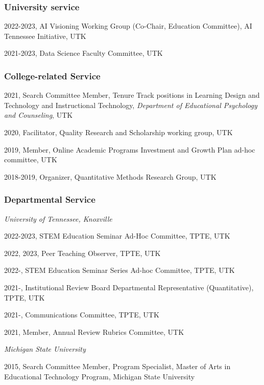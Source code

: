 \documentclass[
  14,
]{article}
\begin{document}
\hypertarget{university-service}{%
\subsubsection{University service}\label{university-service}}

2022-2023, AI Visioning Working Group (Co-Chair, Education Committee),
AI Tennessee Initiative, UTK

2021-2023, Data Science Faculty Committee, UTK

\hypertarget{college-related-service}{%
\subsubsection{College-related Service}\label{college-related-service}}

2021, Search Committee Member, Tenure Track positions in Learning Design
and Technology and Instructional Technology, \emph{Department of
Educational Psychology and Counseling}, UTK

2020, Facilitator, Quality Research and Scholarship working group, UTK

2019, Member, Online Academic Programs Investment and Growth Plan ad-hoc
committee, UTK

2018-2019, Organizer, Quantitative Methods Research Group, UTK

\hypertarget{departmental-service}{%
\subsubsection{Departmental Service}\label{departmental-service}}

\emph{University of Tennessee, Knoxville}

2022-2023, STEM Education Seminar Ad-Hoc Committee, TPTE, UTK

2022, 2023, Peer Teaching Observer, TPTE, UTK

2022-, STEM Education Seminar Series Ad-hoc Committee, TPTE, UTK

2021-, Institutional Review Board Departmental Representative
(Quantitative), TPTE, UTK

2021-, Communications Committee, TPTE, UTK

2021, Member, Annual Review Rubrics Committee, UTK

\emph{Michigan State University}

2015, Search Committee Member, Program Specialist, Master of Arts in
Educational Technology Program, Michigan State University
\end{document}
